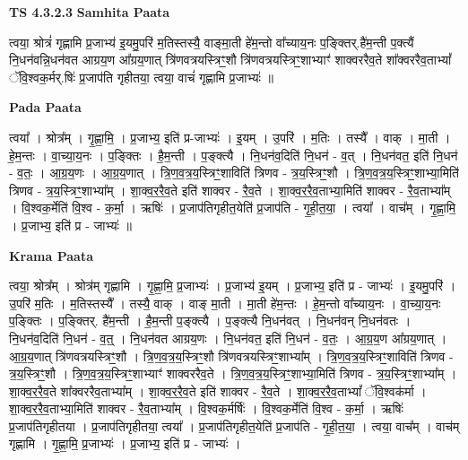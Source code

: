 \documentclass[17pt]{extarticle}
\begin{document}
\textbf{TS 4.3.2.3 } \newline
\textbf{Samhita Paata} \newline

त्वया॒ श्रोत्रं॑ गृह्णामि प्र॒जाभ्य॑ इ॒यमु॒परि॑ म॒तिस्तस्यै॒ वाङ्मा॒ती हे॑म॒न्तो वा᳚च्याय॒नः प॒ङ्क्तिर्.है॑म॒न्ती प॒क्त्यैं नि॒धन॑वन्नि॒धन॑वत आग्रय॒ण आ᳚ग्रय॒णात् त्रि॑णवत्रयस्त्रिꣳ॒॒शौ त्रि॑णवत्रयस्त्रिꣳ॒॒शाभ्याꣳ॑ शाक्वररैव॒ते शा᳚क्वररैव॒ताभ्यां᳚ ॅवि॒श्वक॒र्मर्.षिः॑ प्र॒जाप॑ति गृहीतया॒ त्वया॒ वाचं॑ गृह्णामि प्र॒जाभ्यः॑ ॥ \newline

\textbf{Pada Paata} \newline

त्वया᳚ । श्रोत्र᳚म् । गृ॒ह्णा॒मि॒ । प्र॒जाभ्य॒ इति॑ प्र-जाभ्यः॑ । इ॒यम् । उ॒परि॑ । म॒तिः । तस्यै᳚ । वाक् । मा॒ती । हे॒म॒न्तः । वा॒च्या॒य॒नः । प॒ङ्क्तिः । है॒म॒न्ती । प॒ङ्क्त्यै । नि॒धन॑व॒दिति॑ नि॒धन॑ - व॒त् । नि॒धन॑वत॒ इति॑ नि॒धन॑ - व॒तः॒ । आ॒ग्र॒य॒णः । आ॒ग्र॒य॒णात् । त्रि॒ण॒व॒त्र॒य॒स्त्रिꣳ॒॒शाविति॑ त्रिणव - त्र॒य॒स्त्रिꣳ॒॒शौ । त्रि॒ण॒व॒त्र॒य॒स्त्रिꣳ॒॒शाभ्या॒मिति॑ त्रिणव - त्र॒य॒स्त्रिꣳ॒॒शाभ्या᳚म् । शा॒क्व॒र॒रै॒व॒ते इति॑ शाक्वर - रै॒व॒ते । शा॒क्व॒र॒रै॒व॒ताभ्या॒मिति॑ शाक्वर - रै॒व॒ताभ्या᳚म् । वि॒श्वक॒र्मेति॑ वि॒श्व - क॒र्मा॒ । ऋषिः॑ । प्र॒जाप॑तिगृहीत॒येति॑ प्र॒जाप॑ति - गृ॒ही॒त॒या॒ । त्वया᳚ । वाच᳚म् । गृ॒ह्णा॒मि॒ । प्र॒जाभ्य॒ इति॑ प्र - जाभ्यः॑ ॥  \newline


\textbf{Krama Paata} \newline

त्वया॒ श्रोत्र᳚म् । श्रोत्र॑म् गृह्णामि । गृ॒ह्णा॒मि॒ प्र॒जाभ्यः॑ । प्र॒जाभ्य॑ इ॒यम् । प्र॒जाभ्य॒ इति॑ प्र - जाभ्यः॑ । इ॒यमु॒परि॑ । उ॒परि॑ म॒तिः । म॒तिस्तस्यै᳚ । तस्यै॒ वाक् । वाङ् मा॒ती । मा॒ती हे॑म॒न्तः । हे॒म॒न्तो वा᳚च्याय॒नः । वा॒च्या॒य॒नः प॒ङ्क्तिः । प॒ङ्क्तिर्. है॑म॒न्ती । है॒म॒न्ती प॒ङ्क्त्यै । प॒ङ्क्त्यै नि॒धन॑वत् । नि॒धन॑वन् नि॒धन॑वतः । नि॒धन॑व॒दिति॑ नि॒धन॑ - व॒त्॒ । नि॒धन॑वत आग्रय॒णः । नि॒धन॑वत॒ इति॑ नि॒धन॑ - व॒तः॒ । आ॒ग्र॒य॒ण आ᳚ग्रय॒णात् । आ॒ग्र॒य॒णात् त्रि॑णवत्रयस्त्रिꣳ॒॒शौ । त्रि॒ण॒व॒त्र॒य॒स्त्रिꣳ॒॒शौ त्रि॑णवत्रयस्त्रिꣳ॒॒शाभ्या᳚म् । त्रि॒ण॒व॒त्र॒य॒स्त्रिꣳ॒॒शाविति॑ त्रिणव - त्र॒य॒स्त्रिꣳ॒॒शौ । त्रि॒ण॒व॒त्र॒य॒स्त्रिꣳ॒॒शाभ्याꣳ॑ शाक्वररैव॒ते । त्रि॒ण॒व॒त्र॒य॒स्त्रिꣳ॒॒शाभ्या॒मिति॑ त्रिणव - त्र॒य॒स्त्रिꣳ॒॒शाभ्या᳚म् । शा॒क्व॒र॒रै॒व॒ते शा᳚क्वररैव॒ताभ्या᳚म् । शा॒क्व॒र॒रै॒व॒ते इति॑ शाक्वर - रै॒व॒ते । शा॒क्व॒र॒रै॒व॒ताभ्यां᳚ ॅवि॒श्वक॑र्मा । शा॒क्व॒र॒रै॒व॒ताभ्या॒मिति॑ शाक्वर - रै॒व॒ताभ्या᳚म् । वि॒श्वक॒र्मर्षिः॑ । वि॒श्वक॒र्मेति॑ वि॒श्व - क॒र्मा॒ । ऋषिः॑ प्र॒जाप॑तिगृहीतया । प्र॒जाप॑तिगृहीतया॒ त्वया᳚ । प्र॒जाप॑तिगृहीत॒येति॑ प्र॒जाप॑ति - गृ॒ही॒त॒या॒ । त्वया॒ वाच᳚म् । वाच॑म् गृह्णामि । गृ॒ह्णा॒मि॒ प्र॒जाभ्यः॑ । प्र॒जाभ्य॒ इति॑ प्र - जाभ्यः॑ । \newline
\end{document}
